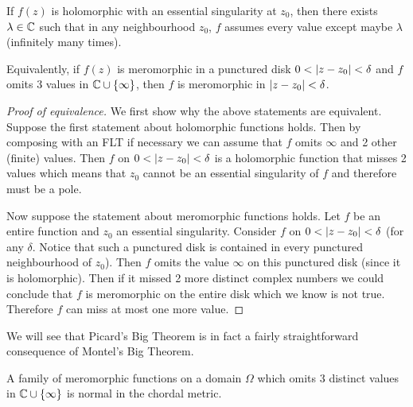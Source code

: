 \begin{theorem}
    If $f(z)$ is holomorphic with an essential singularity at $z_0$, then there exists $\lambda \in \mathbb{C}$ such that in any neighbourhood $z_0$, $f$ assumes every value except maybe $\lambda$ (infinitely many times).

    Equivalently, if $f(z)$ is meromorphic in a punctured disk $0 < \left|z - z_0\right| < \delta$ and $f$ omits 3 values in $\mathbb{C} \cup \{\infty\}$, then $f$ is meromorphic in $\left|z - z_0\right| < \delta$.
\end{theorem}
\begin{proof}[Proof of equivalence]
    We first show why the above statements are equivalent. Suppose the first statement about holomorphic functions holds. Then by composing with an FLT if necessary we can assume that $f$ omits $\infty$ and 2 other (finite) values. Then $f$ on $0 < \left|z - z_0\right| < \delta$ is a holomorphic function that misses 2 values which means that $z_0$ cannot be an essential singularity of $f$ and therefore must be a pole.

    Now suppose the statement about meromorphic functions holds. Let $f$ be an entire function and $z_0$ an essential singularity. Consider $f$ on $0 < \left|z - z_0\right| < \delta$ (for any $\delta$. Notice that such a punctured disk is contained in every punctured neighbourhood of $z_0$). Then $f$ omits the value $\infty$ on this punctured disk (since it is holomorphic). Then if it missed 2 more distinct complex numbers we could conclude that $f$ is meromorphic on the entire disk which we know is not true. Therefore $f$ can miss at most one more value.
\end{proof}

We will see that Picard's Big Theorem is in fact a fairly straightforward consequence of Montel's Big Theorem.
\begin{theorem}
    A family of meromorphic functions on a domain $\Omega$ which omits 3 distinct values in $\mathbb{C} \cup \{\infty\}$ is normal in the chordal metric.
\end{theorem}
